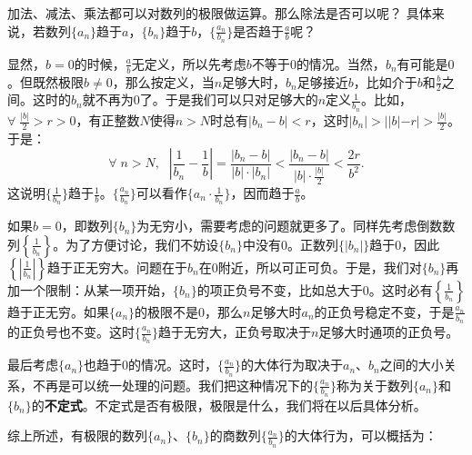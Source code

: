 \documentclass[12pt,UTF8]{ctexbook}
\begin{document}
加法、减法、乘法都可以对数列的极限做运算。那么除法是否可以呢？
具体来说，若数列$\{a_n\}$趋于$a$，$\{b_n\}$趋于$b$，$\{\frac{a_n}{b_n}\}$是否趋于$\frac{a}{b}$呢？

显然，$b=0$的时候，$\frac{a}{b}$无定义，所以先考虑$b$不等于$0$的情况。当然，$b_n$有可能是$0$。但既然极限$b\neq 0$，那么按定义，当$n$足够大时，$b_n$足够接近$b$，比如介于$b$和$\frac{b}{2}$之间。这时的$b_n$就不再为$0$了。于是我们可以只对足够大的$n$定义$\frac{1}{b_n}$。比如，$\forall \; \frac{|b|}{2}>r>0$，有正整数$N$使得$n>N$时总有$|b_n - b| < r$，这时$|b_n| > ||b| - r| > \frac{|b|}{2}$。于是：
$$ \forall\; n>N, \,\;\, \left| \frac{1}{b_n} - \frac{1}{b} \right| = \frac{|b_n - b|}{|b|\cdot|b_n|} < \frac{|b_n - b|}{|b|\cdot\frac{|b|}{2}} < \frac{2r}{b^2}.$$
这说明$\{\frac{1}{b_n}\}$趋于$\frac{1}{b}$。$\{\frac{a_n}{b_n}\}$可以看作$\{a_n \cdot \frac{1}{b_n}\}$，因而趋于$\frac{a}{b}$。

如果$b=0$，即数列$\{b_n\}$为无穷小，需要考虑的问题就更多了。同样先考虑倒数数列$\left\{\frac{1}{b_n}\right\}$。为了方便讨论，我们不妨设$\{b_n\}$中没有$0$。正数列$\{|b_n|\}$趋于$0$，因此$\left\{\left|\frac{1}{b_n}\right|\right\}$趋于正无穷大。问题在于$b_n$在$0$附近，所以可正可负。于是，我们对$\{b_n\}$再加一个限制：从某一项开始，$\{b_n\}$的项正负号不变，比如总大于$0$。这时必有$\left\{\frac{1}{b_n}\right\}$趋于正无穷。如果$\{a_n\}$的极限不是$0$，那么$n$足够大时$a_n$的正负号稳定不变，于是$\frac{a_n}{b_n}$的正负号也不变。这时$\{\frac{a_n}{b_n}\}$趋于无穷大，正负号取决于$n$足够大时通项的正负号。

最后考虑$\{a_n\}$也趋于$0$的情况。这时，$\{\frac{a_n}{b_n}\}$的大体行为取决于$a_n$、$b_n$之间的大小关系，不再是可以统一处理的问题。我们把这种情况下的$\{\frac{a_n}{b_n}\}$称为关于数列$\{a_n\}$和$\{b_n\}$的\textbf{不定式}。不定式是否有极限，极限是什么，我们将在以后具体分析。

综上所述，有极限的数列$\{a_n\}$、$\{b_n\}$的商数列$\{\frac{a_n}{b_n}\}$的大体行为，可以概括为：
\begin{center}
\end{center}
\end{document}
